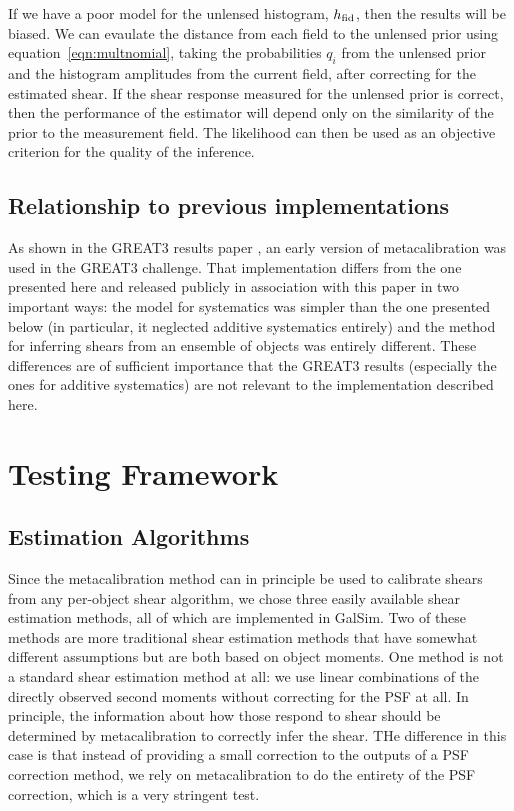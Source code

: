 \documentclass[iop]{emulateapj}
\begin{document}
If we have a poor model for the unlensed histogram, $h_{\rm fid}$,
then the results will be biased. We can evaulate the distance from
each field to the unlensed prior using equation~\ref{eqn:multnomial},
taking the probabilities $q_i$ from the unlensed prior and the
histogram amplitudes from the current field, {after correcting for the
  estimated shear}. If the shear response measured for the unlensed
prior is correct, then the performance of the estimator will depend
only on the similarity of the prior to the measurement field. The
likelihood can then be used as an objective criterion for the quality
of the inference.

\subsection{Relationship to previous implementations}

As shown in the GREAT3 results paper \citep{2015MNRAS.450.2963M}, an
early version of metacalibration was used in the GREAT3 challenge.
That implementation differs from the one presented here and released
publicly in association with this paper in two important ways: the
model for systematics was simpler than the one presented below (in
particular, it neglected additive systematics entirely) and the method
for inferring shears from an ensemble of objects was entirely
different.  These differences are of sufficient importance that the
GREAT3 results (especially the ones for additive systematics) are not
relevant to the implementation described here.


\section{Testing Framework}
\label{sec:testing}

\subsection{Estimation Algorithms}

Since the metacalibration method can in principle be used to calibrate
shears from any per-object shear algorithm, we chose three easily
available shear estimation methods, all of which are implemented in
GalSim.  Two of these methods are more traditional shear estimation
methods that have somewhat different assumptions but are both based on
object moments.  One method is not a standard shear estimation method
at all: we use linear combinations of the directly observed second
moments without correcting for the PSF at all.  In principle, the
information about how those respond to shear should be determined by
metacalibration to correctly infer the shear.  THe difference in this
case is that instead of providing a small correction to the outputs of
a PSF correction method, we rely on metacalibration to do the entirety
of the PSF correction, which is a very stringent test.
\end{document}
